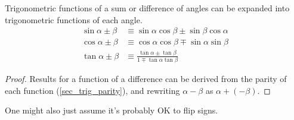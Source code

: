 \begin{theorem} \label{thm_trig_compound}
Trigonometric functions of a sum or difference of angles can be expanded into
trigonometric functions of each angle.
\begin{align*}
\sin \alpha \pm \beta &\equiv
   \sin \alpha \cos \beta \pm \sin \beta \cos \alpha \\
\cos \alpha \pm \beta &\equiv
   \cos \alpha \cos \beta \mp \sin \alpha \sin \beta \\
\tan \alpha \pm \beta &\equiv
    \frac{\tan \alpha \pm \tan \beta}{1 \mp \tan \alpha \tan \beta}
\end{align*}
\end{theorem}
\begin{proof}
Results for a function of a difference can be derived from the parity of
each function (\ref{sec_trig_parity}), and rewriting \(\alpha - \beta\) as
\(\alpha + (-\beta)\).
\end{proof}
One might also just assume it's probably OK to flip signs.

